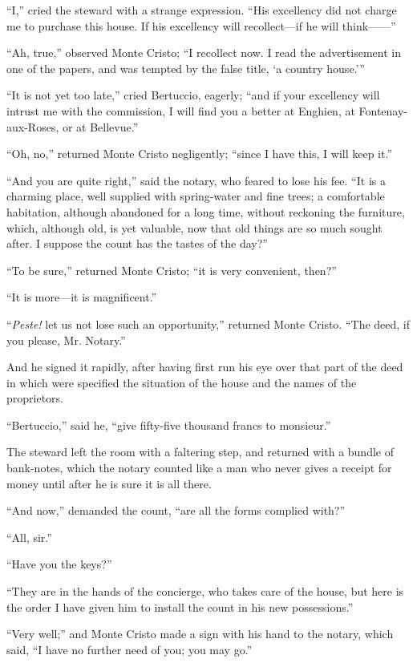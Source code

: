 “I,” cried the steward with a strange expression. “His excellency did
not charge me to purchase this house. If his excellency will
recollect—if he will think——”

“Ah, true,” observed Monte Cristo; “I recollect now. I read the
advertisement in one of the papers, and was tempted by the false title,
‘a country house.’”

“It is not yet too late,” cried Bertuccio, eagerly; “and if your
excellency will intrust me with the commission, I will find you a
better at Enghien, at Fontenay-aux-Roses, or at Bellevue.”

“Oh, no,” returned Monte Cristo negligently; “since I have this, I will
keep it.”

“And you are quite right,” said the notary, who feared to lose his fee.
“It is a charming place, well supplied with spring-water and fine
trees; a comfortable habitation, although abandoned for a long time,
without reckoning the furniture, which, although old, is yet valuable,
now that old things are so much sought after. I suppose the count has
the tastes of the day?”

“To be sure,” returned Monte Cristo; “it is very convenient, then?”

“It is more—it is magnificent.”

“\textit{Peste!} let us not lose such an opportunity,” returned Monte Cristo.
“The deed, if you please, Mr. Notary.”

And he signed it rapidly, after having first run his eye over that part
of the deed in which were specified the situation of the house and the
names of the proprietors.

“Bertuccio,” said he, “give fifty-five thousand francs to monsieur.”

The steward left the room with a faltering step, and returned with a
bundle of bank-notes, which the notary counted like a man who never
gives a receipt for money until after he is sure it is all there.

“And now,” demanded the count, “are all the forms complied with?”

“All, sir.”

“Have you the keys?”

“They are in the hands of the concierge, who takes care of the house,
but here is the order I have given him to install the count in his new
possessions.”

“Very well;” and Monte Cristo made a sign with his hand to the notary,
which said, “I have no further need of you; you may go.”

